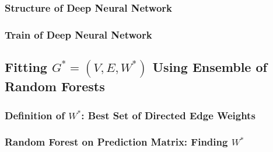 \documentclass[12pt,letterpaper]{article}
\begin{document}








\subsubsection{Structure of Deep Neural Network} 
\subsubsection{Train of Deep Neural Network} 








\subsection{Fitting $G^* = (V, E, W^*)$ Using Ensemble of Random Forests}
\subsubsection{Definition of $W^*$: Best Set of Directed Edge Weights} %


\subsubsection{Random Forest on Prediction Matrix: Finding $W^*$} %

\end{document}

